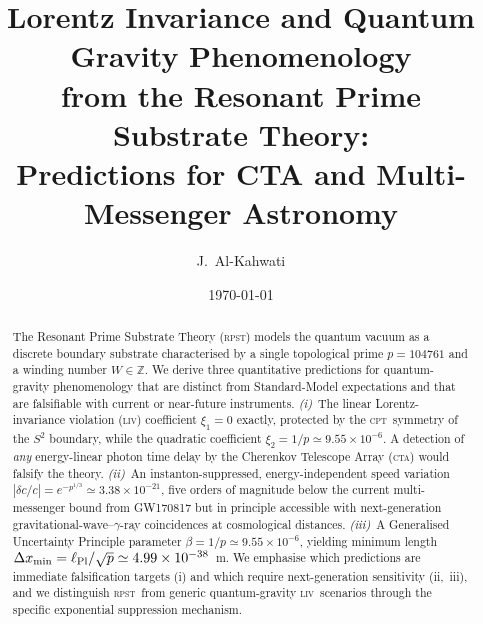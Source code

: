 \documentclass[aps,prd,twocolumn,showpacs,preprintnumbers]{revtex4-2}
\newcommand{\rpst}{\textsc{rpst}}
\newcommand{\lpl}{\ell_{\rm Pl}}
\newcommand{\CTA}{\textsc{cta}}
\newcommand{\LIV}{\textsc{liv}}
\newcommand{\CPT}{\textsc{cpt}}
\newcommand{\abs}[1]{\left|#1\right|}
\begin{document}

\title{Lorentz Invariance and Quantum Gravity Phenomenology\\
       from the Resonant Prime Substrate Theory:\\
       Predictions for CTA and Multi-Messenger Astronomy}

\author{J.~Al-Kahwati}

\date{\today}

\begin{abstract}
The Resonant Prime Substrate Theory (\rpst) models the quantum vacuum as a
discrete boundary substrate characterised by a single topological prime $p =
104761$ and a winding number $W \in \mathbb{Z}$.  We derive three
quantitative predictions for quantum-gravity phenomenology that are distinct
from Standard-Model expectations and that are falsifiable with current or
near-future instruments.
\textit{(i)}~The linear Lorentz-invariance violation (\LIV) coefficient
$\xi_1 = 0$ exactly, protected by the \CPT\ symmetry of the $S^2$ boundary,
while the quadratic coefficient $\xi_2 = 1/p \simeq 9.55 \times 10^{-6}$.
A detection of \textit{any} energy-linear photon time delay by the Cherenkov
Telescope Array (\CTA) would falsify the theory.
\textit{(ii)}~An instanton-suppressed, energy-independent speed variation
$\abs{\delta c/c} = e^{-p^{1/3}} \simeq 3.38 \times 10^{-21}$, five orders
of magnitude below the current multi-messenger bound from GW170817 but in
principle accessible with next-generation gravitational-wave–$\gamma$-ray
coincidences at cosmological distances.
\textit{(iii)}~A Generalised Uncertainty Principle parameter $\beta = 1/p
\simeq 9.55 \times 10^{-6}$, yielding minimum length $\Delta x_{\min} =
\lpl/\sqrt{p} \simeq 4.99 \times 10^{-38}$~m.
We emphasise which predictions are immediate falsification targets (i) and
which require next-generation sensitivity (ii,~iii), and we distinguish
\rpst\ from generic quantum-gravity \LIV\ scenarios through the specific
exponential suppression mechanism.
\end{abstract}


\maketitle
\end{document}

